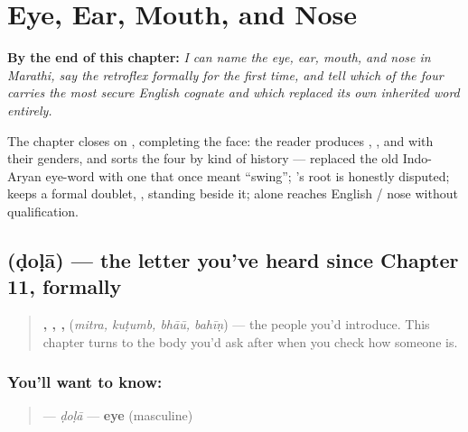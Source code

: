 
\chapter{Eye, Ear, Mouth, and Nose}
\label{ch:mr-face-parts}

\begin{chapteropening}
\textbf{By the end of this chapter:} \emph{I can name the eye, ear, mouth, and nose in Marathi, say the retroflex  formally for the first time, and tell which of the four carries the most secure English cognate and which replaced its own inherited word entirely.}

The chapter closes on , completing the face: the reader produces , ,  and  with their genders, and sorts the four by kind of history —  replaced the old Indo-Aryan eye-word with one that once meant \textquotedblleft{}swing\textquotedblright{}; 's root is honestly disputed;  keeps a formal doublet, , standing beside it;  alone reaches English  / nose without qualification.
\end{chapteropening}

\section[\texorpdfstring{\mr{डोळा} (ḍoḷā)}{डोळा (ḍoḷā)}]{ (ḍoḷā) — the letter you've heard since Chapter 11, formally}

\label{lesson:MR-C12-dola}



\begin{quote}
\textbf{, , , } (\emph{mitra, kuṭumb, bhāū, bahīṇ}) — the people you'd introduce. This chapter turns to the body you'd ask after when you check how someone is.
\end{quote}

\subsection*{You'll want to know: }
\begin{quote}
\textbf{} — \emph{ḍoḷā} — \textbf{eye} (masculine)
\end{quote}

